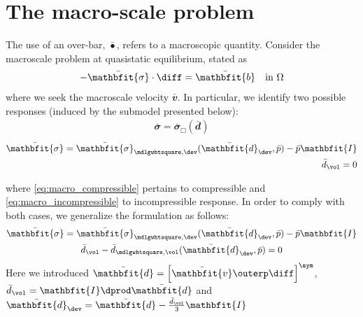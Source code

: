 \documentclass[a4paper,11pt]{article}
\renewcommand{\ta}[1]{\mathbfit{#1}}
\renewcommand{\ts}[1]{\mathbfit{#1}}
\renewcommand{\Box}{\mdlgwhtsquare}
\begin{document}
\section{The macro-scale problem} \label{sec:macro}
The use of an over-bar, $\bar{\bullet}$, refers to a macroscopic quantity.
Consider the macroscale problem at quasistatic equilibrium, stated as
\begin{align}
 -\bar{\ts\sigma}\cdot \diff = \bar{\ts b} \quad \text{in } \Omega
\end{align}
where we seek the macroscale velocity $\bar{\ts v}$. In particular, we identify two possible responses (induced by the submodel presented below):
\begin{gather}
 \bar{\ts\sigma} = \bar{\ts\sigma}_\Box(\bar{\ts d}) \label{eq:macro_compressible}
\end{gather}
\vspace{-2\baselineskip} %
\begin{subequations} \label{eq:macro_incompressible}
\begin{align}
  \bar{\ts\sigma} = \bar{\ts\sigma}_{\Box,\dev}(\bar{\ts d}_\dev, \bar p) - \bar p \ts I\\
  \bar{d}_\vol = 0
\end{align}
\end{subequations}


where \eqref{eq:macro_compressible} pertains to compressible and \eqref{eq:macro_incompressible} to incompressible response.
In order to comply with both cases, we generalize the formulation as follows:
\begin{subequations} \label{eq:macro_mixed}
\begin{gather}
 \bar{\ts\sigma} = \bar{\ts\sigma}_{\Box,\dev}(\bar{\ts d}_\dev,\bar p) - \bar p\ts I\\
 \bar{d}_\vol - \bar{d}_{\Box,\vol}(\bar{\ts d}_\dev, \bar p) = 0
\end{gather}
\end{subequations}
Here we introduced $\bar{\ts d} = \left[ \bar{\ta v} \outerp \diff \right]^\sym$, $\bar{d}_\vol = \ts I \dprod \bar{\ts d}$ and $\bar{\ts d}_\dev = \bar{\ts d} - \frac{\bar d_\vol}{3}\ts I$ 
\end{document}
